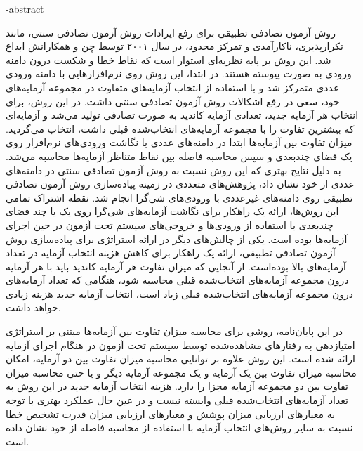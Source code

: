 \fa-abstract{

روش آزمون تصادفی تطبیقی برای رفع ایرادات روش آزمون تصادفی سنتی، مانند تکرارپذیری، ناکارآمدی و تمرکز محدود، در سال ۲۰۰۱ توسط چِن و همکارانش ابداع شد. این روش بر پایه نظریه‌ای استوار است که نقاط خطا و شکست درون دامنه ورودی به صورت پیوسته هستند. در ابتدا، این روش روی نرم‌افزارهایی با دامنه ورودی عددی متمرکز شد و با استفاده از انتخاب آزمایه‌های متفاوت در مجموعه آزمایه‌های خود، سعی در رفع اشکالات روش آزمون تصادفی سنتی داشت. 
در این روش، برای انتخاب هر آزمایه جدید، تعدادی آزمایه کاندید به صورت تصادفی تولید می‌شد و آزمایه‌ای که بیشترین تفاوت را با مجموعه آزمایه‌های انتخاب‌شده قبلی داشت، انتخاب می‌گردید. میزان تفاوت بین آزمایه‌ها ابتدا در دامنه‌های عددی با نگاشت ورودی‌های نرم‌افزار روی یک فضای چندبعدی و سپس محاسبه فاصله بین نقاط متناظر آزمایه‌ها محاسبه می‌شد.
به دلیل نتایج بهتری که این روش نسبت به روش آزمون تصادفی سنتی در دامنه‌های عددی از خود نشان داد، پژوهش‌های متعددی در زمینه پیاده‌سازی روش آزمون تصادفی تطبیقی روی دامنه‌های غیرعددی با ورودی‌های شی‌گرا انجام شد. نقطه اشتراک تمامی این روش‌ها، ارائه یک راهکار برای نگاشت آزمایه‌های شی‌گرا روی یک یا چند فضای چندبعدی با استفاده از ورودی‌ها و خروجی‌های سیستم تحت آزمون در حین اجرای آزمایه‌ها بوده است.
یکی از چالش‌های دیگر در ارائه استراتژی برای پیاده‌سازی روش آزمون تصادفی تطبیقی، ارائه یک راهکار برای کاهش هزینه انتخاب آزمایه در تعداد آزمایه‌های بالا بوده‌است. از آنجایی که میزان تفاوت هر آزمایه کاندید باید با هر آزمایه درون مجموعه آزمایه‌های انتخاب‌شده قبلی محاسبه شود، هنگامی که تعداد آزمایه‌های درون مجموعه آزمایه‌های انتخاب‌شده قبلی زیاد است، انتخاب آزمایه جدید هزینه زیادی خواهد داشت.

در این پایان‌نامه، روشی برای محاسبه میزان تفاوت بین آزمایه‌ها مبتنی بر استراتژی امتیازدهی به رفتارهای مشاهده‌شده توسط سیستم تحت آزمون در هنگام اجرای آزمایه ارائه شده است. این روش علاوه بر توانایی محاسبه میزان تفاوت بین دو آزمایه، امکان محاسبه میزان تفاوت بین یک آزمایه و یک مجموعه آزمایه دیگر و یا حتی محاسبه میزان تفاوت بین دو مجموعه آزمایه مجزا را دارد. هزینه انتخاب آزمایه جدید در این روش به تعداد آزمایه‌های انتخاب‌شده قبلی وابسته نیست و در عین حال عملکرد بهتری با توجه به معیارهای ارزیابی میزان پوشش و معیارهای ارزیابی میزان قدرت تشخیص خطا نسبت به سایر روش‌های انتخاب آزمایه با استفاده از محاسبه فاصله از خود نشان داده است.

}
